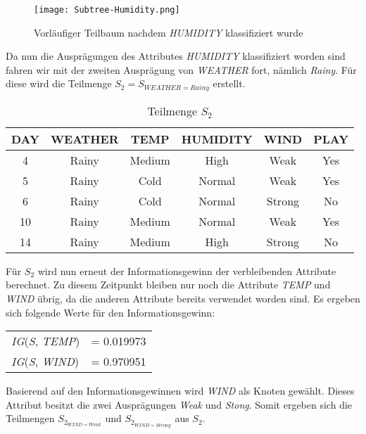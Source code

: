 \begin{figure}[htbp]
    \centering
    \texttt{[image: Subtree-Humidity.png]}
    \caption{Vorläufiger Teilbaum nachdem \textit{HUMIDITY} klassifiziert wurde}
\end{figure}

Da nun die Ausprägungen des Attributes \textit{HUMIDITY} klassifiziert worden sind fahren wir mit der zweiten Ausprägung von \textit{WEATHER} fort, nämlich \textit{Rainy}. Für diese wird die Teilmenge $S_{2} = S_{WEATHER=Rainy}$ erstellt.

\begin{table}[htbp]
    \centering
    \begin{tabular}{cccccc}
        \toprule
        \textbf{DAY} & \textbf{WEATHER} & \textbf{TEMP} & \textbf{HUMIDITY} & \textbf{WIND} & \textbf{PLAY} \\
        \toprule
        4   &Rainy	&Medium	&High	&Weak	&Yes \\
        5   &Rainy	&Cold	&Normal	&Weak	&Yes \\
        6   &Rainy	&Cold	&Normal	&Strong	&No  \\
        10  &Rainy	&Medium	&Normal	&Weak	&Yes \\
        14  &Rainy	&Medium	&High	&Strong	&No  \\
        \bottomrule
    \end{tabular}
    \caption{Teilmenge $S_{2}$}
    \label{table:datensatz-Rainy}
\end{table}

Für $S_{2}$ wird nun erneut der Informationsgewinn der verbleibenden Attribute berechnet. Zu diesem Zeitpunkt bleiben nur noch die Attribute \textit{TEMP} und \textit{WIND} übrig, da die anderen Attribute bereits verwendet worden sind. Es ergeben sich folgende Werte für den Informationsgewinn:

\begin{table}[htbp]
    \centering
    \begin{tabular}{lc}
        \textit{IG}(\textit{S}, \textit{TEMP})     &= 0.019973 \\
        \textit{IG}(\textit{S}, \textit{WIND})     &= 0.970951 \\
    \end{tabular}
\end{table}

Basierend auf den Informationsgewinnen wird \textit{WIND} als Knoten gewählt. Dieses Attribut besitzt die zwei Ausprägungen \textit{Weak} und \textit{Stong}. Somit ergeben sich die Teilmengen $S_{2_{WIND=Weak}}$ und $S_{2_{WIND=Strong}}$ aus $S_{2}$.

